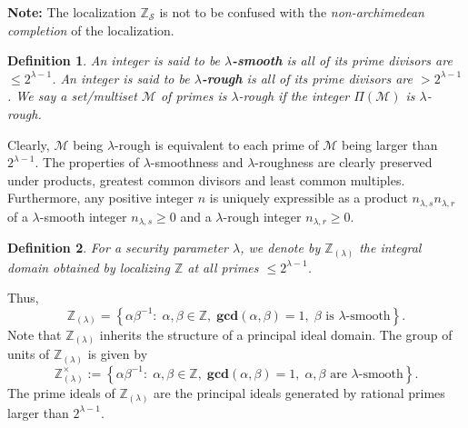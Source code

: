 \documentclass[11pt, lettersize, notitlepage, leqno, footskip=0.6cm]{article}
\newcommand{\bz}{\mathbb Z}
\newcommand{\mc}{\mathcal}
\newcommand{\mbf}{\mathbf}
\newcommand{\al}{\alpha}
\newcommand{\be}{\beta}
\newcommand{\lam}{\lambda}
\newcommand{\lamb}{\lambda}
\newcommand{\bzlam}{\bz_{(\lam)}}
\newcommand{\mcM}{\mc{M}}
\newcommand{\vs}{\vspace{-0.15cm}}
\newcommand{\noin}{\noindent}
\newcommand{\GCD}{\mbf{gcd}}
\newtheorem{Def}{Definition}[section]
\numberwithin{equation}{section}
\begin{document}
\noin \textbf{Note:} The localization $\bz_{\mc{S}}$ is not to be confused with the \textit{non-archimedean completion} of the localization.


\begin{Def} An integer is said to be \textbf{$\lamb$-smooth} is all of its prime divisors are $\leq 2^{\lamb-1}$. An integer is said to be \textbf{$\lamb$-rough} is all of its prime divisors are $> 2^{\lam-1}$. We say a set/multiset $\mcM$ of primes is $\lam$-rough if the integer $\Pi(\mcM)$ is $\lam$-rough. \end{Def}

Clearly, $\mcM$ being $\lam$-rough is equivalent to each prime of $\mcM$ being larger than $2^{\lam-1}$. The properties of $\lamb$-smoothness and $\lamb$-roughness are clearly preserved under products, greatest common divisors and least common multiples. Furthermore, any positive integer $n$ is uniquely expressible as a product $n_{{\lam,s}}n_{{\lam,r}}$ of a $\lam$-smooth integer $n_{{\lam,s}}\geq 0$ and a $\lam$-rough integer $n_{{\lam,r}}\geq 0$.

\begin{Def} For a security parameter $\lam$, we denote by $\bz_{(\lamb)}$ the integral domain obtained by localizing $\bz$ at all primes $\leq 2^{\lamb-1}$. \end{Def}

\noindent Thus, \vs $$\bz_{(\lamb)} = \left\{{\al}{\be}^{-1}:\; \al,\be\in\bz,\;\GCD(\al,\be) = 1,\; \be \text{ is } \lamb\text{-smooth}\right\}.$$ Note that $\bz_{(\lamb)}$ inherits the structure of a principal ideal domain. The group of units of $\bzlam$ is given by $$\bzlam^{\times} := \left\{{\al}{\be}^{-1}:\; \al,\be\in\bz,\;\GCD(\al,\be) = 1,\; \al, \be \text{ are } \lamb\text{-smooth}\right\}. $$ The prime ideals of $\bz_{(\lamb)}$ are the principal ideals generated by rational primes larger than $2^{\lam-1}$.
\end{document}
